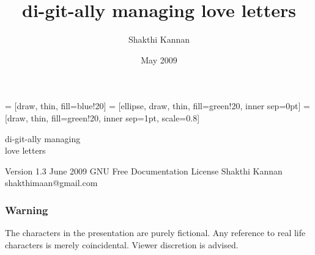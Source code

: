 \documentclass[10pt]{beamer}
\title{di-git-ally managing love letters}
\author{Shakthi Kannan}
\date{May 2009}
\institute{shakthimaan.com}
\newcommand{\medsize}[1]{\fontsize{30}{30}\selectfont #1}
\begin{document}
 = [draw, thin, fill=blue!20]
 = [ellipse, draw, thin, fill=green!20, inner sep=0pt]
 = [draw, thin, fill=green!20, inner sep=1pt, scale=0.8]

%
%

\begin{frame}[fragile]
\begin{block}{}
\begin{center}
\medsize{di-git-ally managing \\love letters}
\end{center}
\end{block}



\begin{semiverbatim}
                               Version 1.3
                                 June 2009
            GNU Free Documentation License
                            Shakthi Kannan
                     shakthimaan@gmail.com
\end{semiverbatim}
\end{frame}

%
%

\begin{frame}[fragile]
\frametitle{Warning}
\begin{center}
\medsize{The characters in the presentation are purely fictional. 
Any reference to real life characters is merely coincidental. 
Viewer discretion is advised.}
\end{center}
\end{frame}

%
%
\end{document}
